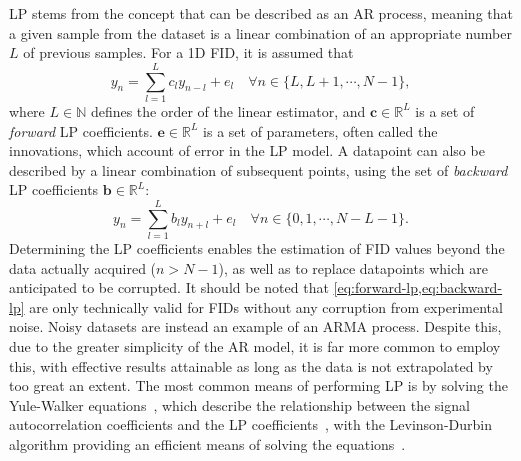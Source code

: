 \ac{LP} stems from the concept that  can be described as
an \ac{AR} process, meaning that a given sample from the dataset is a linear
combination of an appropriate number $L$ of previous samples. For a \ac{1D}
\ac{FID}, it is assumed that
\begin{equation}
    y_n = \sum_{l=1}^{L}
    c_l y_{n-l} + e_l \quad
    \forall n \in \lbrace L, L + 1, \cdots, N - 1 \rbrace,
    \label{eq:forward-lp}
\end{equation}
where $L \in
\mathbb{N}$ defines the order of the linear estimator, and $\symbf{c} \in
\mathbb{R}^{L}$ is a set of \emph{forward} \ac{LP} coefficients. $\symbf{e} \in
\mathbb{R}^L$ is a set of parameters, often called the innovations,
which account of error in the \ac{LP} model. A datapoint can also be described
by a linear combination of subsequent points, using the set of \emph{backward}
\ac{LP} coefficients $\symbf{b} \in \mathbb{R}^L$:
\begin{equation}
    y_n = \sum_{l=1}^{L}
    b_l y_{n+l} + e_l \quad
    \forall n \in \lbrace 0, 1, \cdots, N - L - 1 \rbrace.
    \label{eq:backward-lp}
\end{equation}
Determining
the \ac{LP} coefficients enables the estimation of \ac{FID} values beyond the
data actually acquired ($n > N - 1$), as well as to replace
datapoints which are anticipated to be corrupted. It should be noted that
\cref{eq:forward-lp,eq:backward-lp} are only technically valid for
\acp{FID} without any corruption from experimental noise. Noisy datasets are
instead an example of an \ac{ARMA} process. Despite this, due to the greater
simplicity of the \ac{AR} model, it is far more common to employ this, with
effective results attainable as long as the data is not extrapolated by too
great an extent. The most common means of performing \ac{LP} is by solving the
Yule-Walker equations~\cite{Yule1927,Walker1931}, which describe the
relationship between the signal autocorrelation coefficients and the \ac{LP}
coefficients~\cite[Section 3.3]{Koehl1999}, with the Levinson-Durbin algorithm
providing an efficient means of solving the
equations~\cite{Levinson1946,Durbin1960}.

